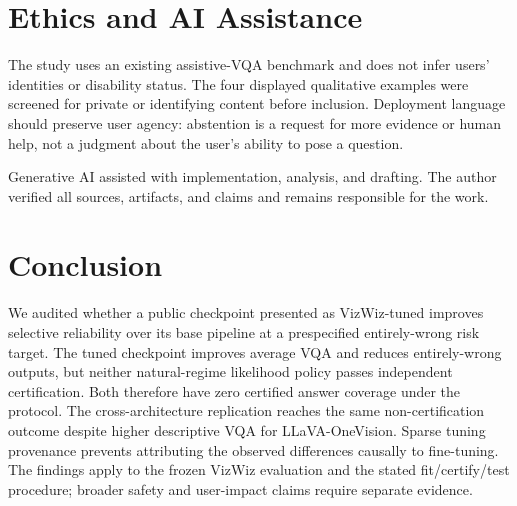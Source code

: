 \documentclass[11pt]{article}
\begin{document}
\section{Ethics and AI Assistance}

The study uses an existing assistive-VQA benchmark and does not infer users'
identities or disability status.  The four displayed qualitative examples were
screened for private or identifying content before inclusion.  Deployment language
should preserve user agency: abstention is a request for more evidence or human help,
not a judgment about the user's ability to pose a question.

Generative AI assisted with implementation, analysis, and drafting.  The author
verified all sources, artifacts, and claims and remains responsible for the work.

\section{Conclusion}

We audited whether a public checkpoint presented as VizWiz-tuned improves
selective reliability over its base pipeline at a prespecified entirely-wrong risk
target.  The tuned checkpoint improves average VQA and reduces entirely-wrong
outputs, but neither natural-regime likelihood policy passes independent
certification.  Both therefore have zero certified answer coverage under the
protocol.  The cross-architecture replication reaches the same non-certification
outcome despite higher descriptive VQA for LLaVA-OneVision.  Sparse tuning
provenance prevents attributing the observed differences causally to fine-tuning.
The findings apply to the frozen VizWiz evaluation and the stated fit/certify/test
procedure; broader safety and user-impact claims require separate evidence.

\renewcommand{\bibfont}{\footnotesize}
\setlength{\bibsep}{1pt}


\end{document}
